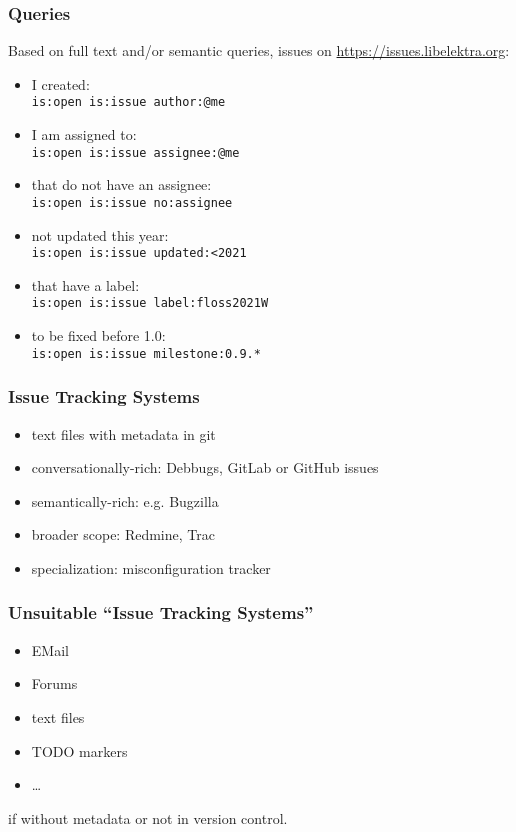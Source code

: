 \begin{frame}[fragile]
	\frametitle{Queries}
	Based on full text and/or semantic queries, issues on \url{https://issues.libelektra.org}:

	\begin{itemize}
		\item I created: \\
			\verb+is:open is:issue author:@me+
		\item I am assigned to: \\
			\verb+is:open is:issue assignee:@me+
		\item that do not have an assignee: \\
			\verb+is:open is:issue no:assignee+
		\item not updated this year: \\
			\verb+is:open is:issue updated:<2021+
		\item that have a label: \\
			\verb+is:open is:issue label:floss2021W+
		\item to be fixed before 1.0: \\
			\verb+is:open is:issue milestone:0.9.*+
	\end{itemize}
\end{frame}

\begin{frame}
	\frametitle{Issue Tracking Systems}

	\begin{itemize}
		\item text files with metadata in git
		\item conversationally-rich: Debbugs, GitLab or GitHub issues
		\item semantically-rich: e.g. Bugzilla
		\item broader scope: Redmine, Trac
		\item specialization: misconfiguration tracker
	\end{itemize}
\end{frame}

\begin{frame}
	\frametitle{Unsuitable ``Issue Tracking Systems''}

	\begin{itemize}
		\item EMail
		\item Forums
		\item text files
		\item TODO markers
		\item \dots
	\end{itemize}

	if without metadata or not in version control.
\end{frame}

